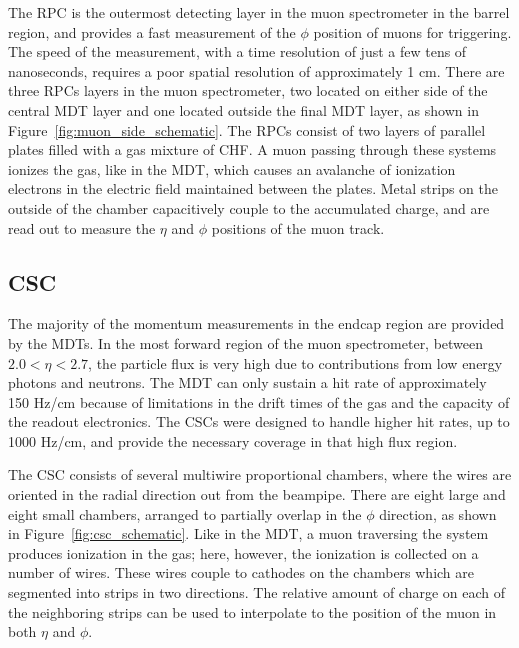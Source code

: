 The \ac{RPC} is the outermost detecting layer in the muon spectrometer in the barrel region, and provides a fast measurement of the $\phi$ position of muons for triggering.
The speed of the measurement, with a time resolution of just a few tens of nanoseconds, requires a poor spatial resolution of approximately 1 cm. 
There are three \acp{RPC} layers in the muon spectrometer, two located on either side of the central \ac{MDT} layer and one located outside the final \ac{MDT} layer, as shown in Figure~\ref{fig:muon_side_schematic}.
The \acp{RPC} consist of two layers of parallel plates filled with a gas mixture of CHF.
A muon passing through these systems ionizes the gas, like in the \ac{MDT}, which causes an avalanche of ionization electrons in the electric field maintained between the plates.
Metal strips on the outside of the chamber capacitively couple to the accumulated charge, and are read out to measure the $\eta$ and $\phi$ positions of the muon track. 

\subsection{\acl{CSC}}
The majority of the momentum measurements in the endcap region are provided by the \acp{MDT}.
In the most forward region of the muon spectrometer, between $2.0 < \eta < 2.7$, the particle flux is very high due to contributions from low energy photons and neutrons.
The \ac{MDT} can only sustain a hit rate of approximately 150 Hz/cm because of limitations in the drift times of the gas and the capacity of the readout electronics. 
The \acp{CSC} were designed to handle higher hit rates, up to 1000 Hz/cm, and provide the necessary coverage in that high flux region.

The \ac{CSC} consists of several multiwire proportional chambers, where the wires are oriented in the radial direction out from the beampipe.
There are eight large and eight small chambers, arranged to partially overlap in the $\phi$ direction, as shown in Figure~\ref{fig:csc_schematic}.
Like in the \ac{MDT}, a muon traversing the system produces ionization in the gas; here, however, the ionization is collected on a number of wires.
These wires couple to cathodes on the chambers which are segmented into strips in two directions.
The relative amount of charge on each of the neighboring strips can be used to interpolate to the position of the muon in both $\eta$ and $\phi$. 

